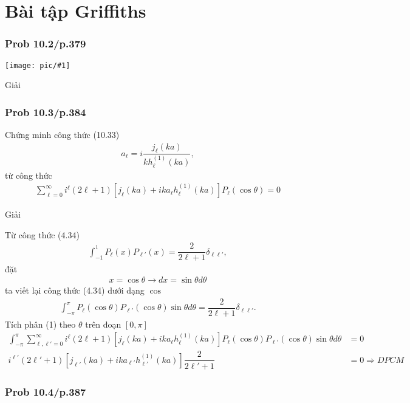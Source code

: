 \documentclass{report}
\newcommand{\image}[1]{
	\begin{center}
		\texttt{[image: pic/\#1]}
	\end{center}
}
\renewcommand{\l}{\ell}
\newcommand{\f}[2]{\dfrac{#1}{#2}}
\begin{document}
\section{Bài tập Griffiths}
\subsubsection{Prob 10.2/p.379}

\image{prob10_2.png}

\noindent Giải

\subsubsection{Prob 10.3/p.384}

Chứng minh công thức (10.33)
\begin{align*}
	a_{\l} = i \f{j_{\l}(ka)}{k h_{\l}^{(1)}(ka)},
\end{align*}
từ công thức
\begin{align*}
	\sum_{\l = 0}^{\infty} i^{\l}(2\l+1) \left[ j_{\l}(ka) + i k a_{\l}h_{\l}^{(1)}(ka) \right] P_{\l}(\cos\theta) = 0 \tag*{(1)}
\end{align*}

\noindent Giải

Từ công thức (4.34)
\begin{align*}
	\int_{-1}^{1} P_{\l}(x) P_{\l'}(x) = \f{2}{2\l + 1}\delta_{\l \l'},
\end{align*}
đặt
\begin{align*}
	x = \cos \theta \rightarrow dx = \sin \theta d\theta
\end{align*}
ta viết lại công thức (4.34) dưới dạng $\cos$
\begin{align*}
	\int_{-\pi}^{\pi} P_{\l}(\cos\theta) P_{\l'}(\cos\theta)\sin\theta d\theta = \f{2}{2\l + 1}\delta_{\l \l'}.
\end{align*}
Tích phân (1) theo $\theta$ trên đoạn $\left[0,\pi\right]$
\begin{align*}
	\int_{-\pi}^{\pi} \sum_{\l,\l' = 0}^{\infty} i^{\l}(2\l+1) \left[ j_{\l}(ka) + i k a_{\l}h_{\l}^{(1)}(ka) \right] P_{\l}(\cos\theta) P_{\l'}(\cos\theta)\sin\theta d\theta & = 0                  \\
	i^{\l'}(2\l'+1) \left[ j_{\l'}(ka) + i k a_{\l'}h_{\l'}^{(1)}(ka) \right] \f{2}{2\l' + 1}                                                                                  & = 0 \Rightarrow DPCM
\end{align*}

\subsubsection{Prob 10.4/p.387}
\end{document}
